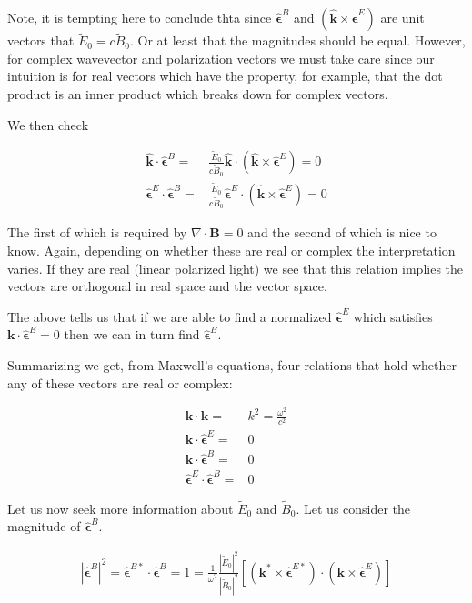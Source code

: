 \documentclass[12pt]{article}
\newcommand{\ep}{\epsilon}
\renewcommand{\vec}[1]{\boldsymbol{#1}}
\newcommand{\unitvec}[1]{\hat{\boldsymbol{#1}}}
\begin{document}
Note, it is tempting here to conclude thta since $\unitvec{\ep}^B$ and $(\unitvec{k}\times \unitvec{\ep}^E)$ are unit vectors that $\tilde{E}_0 = c\tilde{B}_0$.
Or at least that the magnitudes should be equal.
However, for complex wavevector and polarization vectors we must take care since our intuition is for real vectors which have the property, for example, that the dot product is an inner product which breaks down for complex vectors.

We then check

\begin{align}
\unitvec{k}\cdot \unitvec{\ep}^B =& \frac{\tilde{E}_0}{c\tilde{B}_0} \unitvec{k}\cdot\left(\unitvec{k}\times \unitvec{\ep}^E\right) = 0\\
\unitvec{\ep}^E \cdot \unitvec{\ep}^B =& \frac{\tilde{E}_0}{c\tilde{B}_0} \unitvec{\ep}^E \cdot \left(\unitvec{k}\times \unitvec{\ep}^E\right) = 0
\end{align}

The first of which is required by $\nabla \cdot \vec{B}=0$ and the second of which is nice to know.
Again, depending on whether these are real or complex the interpretation varies.
If they are real (linear polarized light) we see that this relation implies the vectors are orthogonal in real space and the vector space.

The above tells us that if we are able to find a normalized $\unitvec{\ep}^E$ which satisfies $\vec{k}\cdot \unitvec{\ep}^E=0$ then we can in turn find $\unitvec{\ep}^B$.

Summarizing we get, from Maxwell's equations, four relations that hold whether any of these vectors are real or complex:

\begin{align}
\vec{k}\cdot\vec{k} =& k^2 = \frac{\omega^2}{c^2}\\
\vec{k}\cdot \unitvec{\ep}^E =& 0\\
\vec{k}\cdot \unitvec{\ep}^B =& 0\\
\unitvec{\ep}^E \cdot \unitvec{\ep}^B =& 0
\end{align}

Let us  now seek more information about $\tilde{E}_0$ and $\tilde{B}_0$.
Let us consider the magnitude of $\unitvec{\ep}^B$.

\begin{align}
\left|\unitvec{\ep}^B\right|^2 = \unitvec{\ep}^{B*}\cdot\unitvec{\ep}^B =1 = \frac{1}{\omega^2} \frac{|\tilde{E}_0|^2}{|\tilde{B}_0|^2} \left[\left(\vec{k}^*\times\unitvec{\ep}^{E*}\right)\cdot\left(\vec{k}\times\unitvec{\ep}^E\right)\right]
\end{align}
\end{document}
